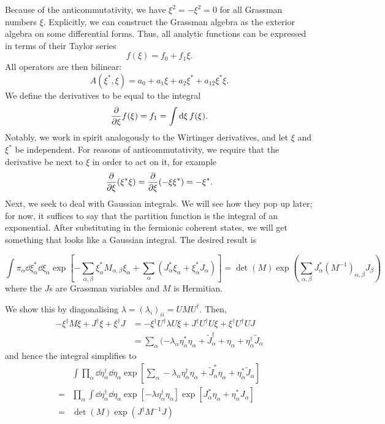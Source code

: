 \documentclass[twoside,symmetric, openany, 12pt]{./tuftebook}
\theoremstyle{definition}
\theoremstyle{definition}
\theoremstyle{definition}
\begin{document}
	Because of the anticommutativity, we have $\xi^2=-\xi^2=0$ for all Grassman numbers $\xi$. Explicitly, we can construct the Grassman algebra as the exterior algebra on some differential forms. Thus, all analytic functions can be expressed in terms of their Taylor series
	\[
	f(\xi) = f_0+ f_1\xi
	.\] 
	All operators are then bilinear:
	\[
	A(\xi^*, \xi) = a_0 + a_1\xi + a_2 \xi^* + a_{12} \xi^* \xi
	.\] 
	We define the derivatives to be equal to the integral
	\[
		\pdv{\xi}f(\xi) = f_1 = \int \dd{\xi} f(\xi)
	.\] 
	Notably, we work in spirit analogously to the Wirtinger derivatives, and let $\xi$ and $\xi^*$ be independent. For reasons of anticommutativity, we require that the derivative be next to $\xi$ in order to act on it, for example
	\[
		\pdv{\xi}(\xi^*\xi) = \pdv{\xi}(-\xi\xi^*) = -\xi^*
	.\] 
	Next, we seek to deal with Gaussian integrals. We will see how they pop up later; for now, it suffices to say that the partition function is the integral of an exponential. After substituting in the fermionic coherent states, we will get something that looks like a Gaussian integral. The desired result is
	\begin{tcolorbox}[title=Gaussian Integrals]
		\[
			\int \pi_\alpha \dd{\xi_\alpha^*}\dd{\xi_\alpha} \exp \left[ -\sum_{\alpha,\beta} \xi_\alpha^* M_{\alpha,\beta} \xi_\alpha + \sum_\alpha \left( J_\alpha^* \xi_\alpha + \xi_\alpha^* J_\alpha \right)  \right] = \det(M) \exp\left( \sum_{\alpha,\beta}J_\alpha^* (M^{-1})_{\alpha, \beta} J_\beta \right) 
		\]
		where the $J$s are Grassman variables and $M$ is Hermitian.
	\end{tcolorbox}
	We show this by diagonalising $\lambda=(\lambda_i)_{ii} = UMU^\dagger$. Then, 
	\begin{align*}
		-\xi^\dagger M \xi + J^\dagger\xi +\xi^\dagger J &= -\xi^\dagger U^\dagger \lambda U \xi + J^\dagger U^\dagger U \xi + \xi^\dagger U^\dagger U J \\
								 &= \sum_\alpha (-\lambda_\alpha \eta_\alpha^* \eta_\alpha + \tilde{J}_\alpha^\dagger + \eta_\alpha + \eta_\alpha^\dagger \tilde{J}_\alpha
	\end{align*}
	and hence the integral simplifies to
	\begin{align*}
	& \int \prod_\alpha \dd{\eta_\alpha^\dagger}\dd{\eta_\alpha} \exp\left[ \sum_\alpha -\lambda_\alpha \eta_\alpha^\dagger \eta_\alpha + \tilde{J}_\alpha^* \eta_\alpha + \eta_\alpha^* \tilde{J}_\alpha \right] \\
		=& \prod_\alpha \int \dd{\eta_\alpha^\dagger}\dd{\eta_\alpha}\exp\left[ -\lambda \eta_\alpha^\dagger \eta_\alpha \right] \exp\left[ J_\alpha^* \eta_\alpha + \eta_\alpha^* J_\alpha \right] \\
		=& \det(M) \exp(J^\dagger M^{-1}J)
	\end{align*}
\end{document}
